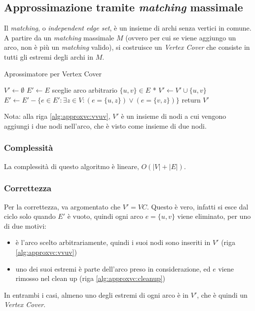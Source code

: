 \subsection{Approssimazione tramite \emph{matching} massimale}

Il \emph{matching}, o \emph{independent edge set}, è un insieme di archi senza vertici in comune.
A partire da un \emph{matching} massimale $M$ (ovvero per cui se viene aggiungo un arco, non è più un \emph{matching} valido), si costruisce un \emph{Vertex Cover} che consiste in tutti gli estremi degli archi in $M$.
\begin{algorithm}[H]
\caption{Aprossimatore per Vertex Cover}\label{alg:approxvc}
\begin{algorithmic}[1]
        \State $V' \gets \emptyset$
        \State $E' \gets E$
            \State * sceglie arco arbitrario $\{ u,v \} \in E$ *
            \State $V' \gets V' \cup \{ u,v \}$
            \label{alg:approxvc:vvuv}
            \State $E' \gets E' - \{ 
                e \in E' : \exists z \in V :
                ( e = \{ u,z \} )
                \vee
                ( e = \{ v,z \} )
            \}
            \label{alg:approxvc:cleanup}
            $
        \EndWhile
        \State return $V'$
    \EndProcedure
\end{algorithmic}
\end{algorithm}
\noindent
Nota: alla riga \ref{alg:approxvc:vvuv}, $V'$ è un insieme di nodi a cui vengono aggiungi i due nodi nell'arco, che è visto come insieme di due nodi.

\subsubsection{Complessità}

La complessità di questo algoritmo è lineare, $O ( |V| + |E| )$.

\subsubsection{Correttezza}

Per la correttezza, va argomentato che $V' = VC$. Questo è vero, infatti si esce dal ciclo solo quando $E'$ è vuoto, quindi ogni arco $e=\{u,v\}$ viene eliminato, per uno di due motivi:
\begin{itemize}[noitemsep,parsep=0pt,partopsep=0pt,topsep=0pt]
    \item è l'arco scelto arbitrariamente, quindi i suoi nodi sono inseriti in $V'$ (riga  \ref{alg:approxvc:vvuv})
    \item uno dei suoi estremi è parte dell'arco preso in considerazione, ed $e$ viene rimosso nel clean up (riga \ref{alg:approxvc:cleanup})
\end{itemize}
In entrambi i casi, almeno uno degli estremi di ogni arco è in $V'$, che è quindi un \emph{Vertex Cover}.

